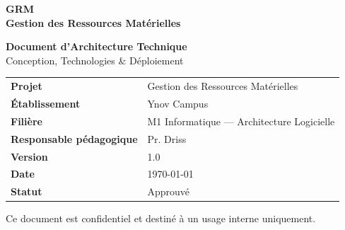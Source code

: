 \documentclass[12pt,a4paper]{report}
\begin{document}

\begin{titlepage}
\pagecolor{primary}
\color{white}
\vspace*{2cm}
\begin{center}
    {\fontsize{38}{46}\selectfont\bfseries GRM}\\[0.4cm]
    {\Large\bfseries Gestion des Ressources Matérielles}\\[2.5cm]

    \colorbox{accent}{\parbox{0.85\textwidth}{\centering\vspace{0.4cm}
    {\huge\bfseries Document d'Architecture Technique}\\[0.2cm]
    {\large Conception, Technologies \& Déploiement}
    \vspace{0.4cm}}}

    \vspace{2.5cm}

    \begin{tabular}{ll}
        \textbf{Projet} & Gestion des Ressources Matérielles \\[4pt]
        \textbf{Établissement} & Ynov Campus \\[4pt]
        \textbf{Filière} & M1 Informatique — Architecture Logicielle \\[4pt]
        \textbf{Responsable pédagogique} & Pr. Driss \\[4pt]
        \textbf{Version} & 1.0 \\[4pt]
        \textbf{Date} & \today \\[4pt]
        \textbf{Statut} & \textcolor{success}{Approuvé} \\
    \end{tabular}

    \vspace{3cm}
    {\small\color{gray} Ce document est confidentiel et destiné à un usage interne uniquement.}
\end{center}
\end{titlepage}
\pagecolor{white}\color{black}

\end{document}
